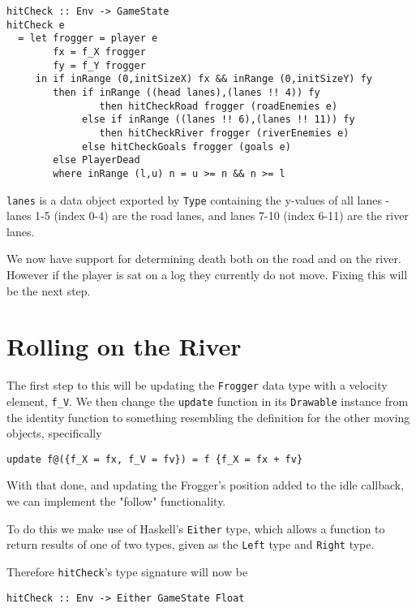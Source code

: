\documentclass[12pt, a4paper]{report}
\begin{document}
\begin{lstlisting}
hitCheck :: Env -> GameState
hitCheck e
  = let frogger = player e
        fx = f_X frogger
        fy = f_Y frogger
     in if inRange (0,initSizeX) fx && inRange (0,initSizeY) fy
        then if inRange ((head lanes),(lanes !! 4)) fy
                then hitCheckRoad frogger (roadEnemies e)
             else if inRange ((lanes !! 6),(lanes !! 11)) fy
                then hitCheckRiver frogger (riverEnemies e)
             else hitCheckGoals frogger (goals e)
        else PlayerDead
        where inRange (l,u) n = u >= n && n >= l
\end{lstlisting}

\verb|lanes| is a data object exported by \verb|Type| containing the y-values of all lanes - lanes 1-5 (index 0-4) are the road lanes, and lanes 7-10 (index 6-11) are the river lanes.

We now have support for determining death both on the road and on the river.
However if the player is sat on a log they currently do not move.
Fixing this will be the next step.

\section{Rolling on the River}

The first step to this will be updating the \verb|Frogger| data type with a velocity element, \verb|f_V|.
We then change the \verb|update| function in its \verb|Drawable| instance from the identity function to something resembling the definition for the other moving objects, specifically

\begin{lstlisting}
update f@({f_X = fx, f_V = fv}) = f {f_X = fx + fv}
\end{lstlisting}

With that done, and updating the Frogger's position added to the idle callback, we can implement the "follow" functionality.

\par

To do this we make use of Haskell's \verb|Either| type, which allows a function to return results of one of two types, given as the \verb|Left| type and \verb|Right| type.

Therefore \verb|hitCheck|'s type signature will now be 

\begin{lstlisting}
hitCheck :: Env -> Either GameState Float
\end{lstlisting}
\end{document}
